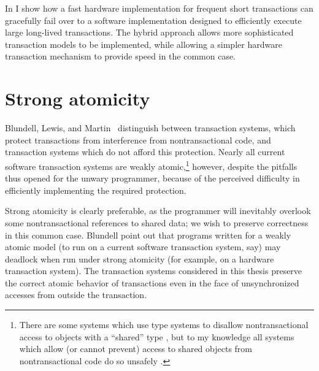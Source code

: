 In  I show how a fast hardware implementation for
frequent short transactions can gracefully fail over to a software
implementation designed to efficiently execute large long-lived
transactions.
The hybrid approach allows more sophisticated transaction models to be
implemented, while allowing a simpler hardware transaction mechanism
to provide speed in the common case.

\section{Strong atomicity}\label{sec:strongatom}
Blundell, Lewis, and Martin~\cite{BlundellLeMa05} distinguish
between 
transaction systems, which protect transactions from interference from
nontransactional code, and  transaction
systems which do not afford this
 protection.
Nearly all current software transaction systems are weakly
atomic,\footnote{There are some systems which use type systems to
disallow nontransactional access to objects with a ``shared'' type
\cite{RudysWa02, HerlihyLuMoSc03, HarrisMaPeHe05}, but to my knowledge
all systems which allow (or cannot prevent) access to shared objects
from nontransactional code do so unsafely
\cite{ShavitTo95,HarrisFr03,Herlihy05b,DiceShSh06,HerlihyLuMo06,FraserHa04}.}
however,
despite the pitfalls thus opened for the unwary programmer, because of
the perceived difficulty in efficiently implementing the required
protection.

Strong atomicity is clearly preferable, as the programmer will
inevitably overlook some nontransactional references to shared data;
we wish to preserve correctness in this common case.
Blundell \etal point out
that programs written for a weakly atomic model (to run on a current software
transaction system, say) may deadlock when run under strong atomicity
(for example, on a hardware transaction system).  The transaction
systems considered in this thesis preserve the
correct atomic behavior of transactions even in the face of
unsynchronized accesses from outside the transaction.


